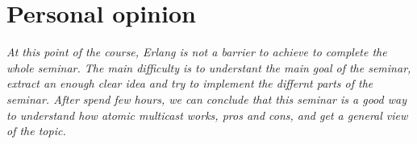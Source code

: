 \section{Personal opinion}

\textit{At this point of the course, Erlang is not a barrier to achieve to complete the whole seminar. The main difficulty is to understant the main goal of the seminar, extract an enough clear idea and try to implement the differnt parts of the seminar.
After spend few hours, we can conclude that this seminar is a good way to understand how atomic multicast works, pros and cons, and get a general view of the topic.}